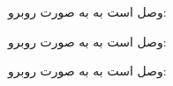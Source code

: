 \begin{boxK}
    وصل است به
    به صورت روبرو:


    وصل است به
    به صورت روبرو:


    وصل است به
    به صورت روبرو:
\end{boxK}